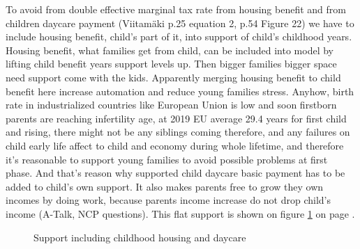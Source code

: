 To avoid from double effective marginal tax rate from housing benefit and
from children daycare payment (Viitam\"aki\allowbreak\cite{VM_46_2019} p.25
equation 2, p.54 Figure 22) we have to include housing benefit, child's part
of it, into support of child's childhood years. Housing benefit, what families
get from child, can be included into model by lifting child benefit years
support levels up. Then bigger families bigger space need support come with
the kids. Apparently merging housing benefit to child benefit here increase
automation and reduce young families stress. Anyhow, birth rate in
industrialized countries like European Union is low and soon firstborn parents
are reaching infertility age, at 2019 EU average 29.4 years for first child
and rising, there might not be any siblings coming therefore, and any failures
on child early life affect to child and economy during whole lifetime, and
therefore it's reasonable to support young families to avoid possible problems
at first phase. And that's reason why supported child daycare basic payment
has to be added to child's own support. It also makes parents free to grow
they own incomes by doing work, because parents income increase do not drop
child's income (A-Talk\allowbreak\cite{ATalk230413213839}, NCP
questions\allowbreak\cite{NCPquestions}). This flat support is shown on figure
\ref{fig:EvenSu} on page
\pageref{fig:EvenSu}.
\begin{figure} %
 \begin{center}
  \caption{Support including childhood housing and daycare}
  \label{fig:EvenSu}  
 \end{center}
\end{figure}

